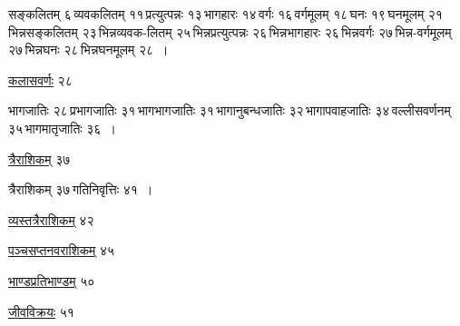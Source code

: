\documentclass[10pt, openany]{book}
\begin{document}
\begin{minipage}{0.8\textwidth}
सङ्कलितम् ६\textemdash \,व्यवकलितम् ११\textemdash \,प्रत्युत्पन्नः १३\textemdash \,भागहारः १४\textemdash \,वर्गः १६\textemdash \,वर्गमूलम् १८\textemdash \,घनः १९\textemdash \,घनमूलम् २१\textemdash \,भिन्नसङ्कलितम् २३\textemdash \,भिन्नव्यवक-लितम् २५\textemdash \,भिन्नप्रत्युत्पन्नः २६\textemdash \,भिन्नभागहारः २६\textemdash \,भिन्नवर्गः २७\textemdash \,भिन्न-वर्गमूलम् २७\textemdash \,भिन्नघनः २८\textemdash \,भिन्नघनमूलम् २८~।
\end{minipage}
\vspace{2mm}

\noindent \hyperref[36]{कलासवर्णः}  \hfill २८ 
\vspace{2mm}

\begin{minipage}{0.8\textwidth}
भागजातिः २८\textemdash \,प्रभागजातिः ३१\textemdash \,भागभागजातिः ३१\textemdash \,भागानुबन्धजातिः ३२\textemdash \,भागापवाहजातिः ३४\textemdash \,वल्लीसवर्णनम् ३५\textemdash \,भागमातृजातिः ३६~।
\end{minipage}

\vspace{2mm}

\noindent \hyperref[43]{त्रैराशिकम्} \hfill ३७

\vspace{2mm}

\begin{minipage}{0.8\textwidth}
त्रैराशिकम् ३७\textemdash \,गतिनिवृत्तिः ४१~। 
\end{minipage}

\vspace{2mm}

\noindent \hyperref[44]{व्यस्तत्रैराशिकम्}  \hfill ४२ 

\vspace{2mm}

\noindent \hyperref[45]{पञ्चसप्तनवराशिकम्}  \hfill ४५ 

\vspace{2mm}

\noindent \hyperref[46.1]{भाण्डप्रतिभाण्डम्} \hfill ५०

\vspace{2mm}

\noindent \hyperref[46]{जीवविक्रयः}  \hfill ५१ 

\vspace{3mm}


\vspace{2mm}
\end{document}
